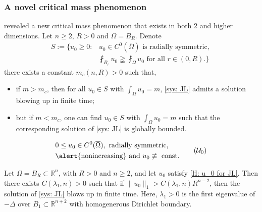 \begin{frame}
\frametitle{A novel critical mass phenomenon}
 revealed a new critical mass phenomenon that exists in both 2 and higher dimensions. Let $n\geqslant 2$, $R>0$ and $\Omega=B_R$. Denote
\begin{align*}
	S:=\biggl\{u_0\geqslant0 : &u_0\in C^0(\overline{\Omega}) \text{ is radially symmetric, } \\ &\fint_{B_r}u_0\gneqq \fint_{\Omega}u_0 \text{ for all } r\in(0, R).\biggr\}
\end{align*}
there exists a constant $m_c(n, R) > 0$ such that, 
\begin{itemize}
    \item if $m>m_c$, then for \alert{all}
$u_0\in S$
with $\int_\Omega u_0 = m$, 
 \eqref{sys: JL} admits a solution blowing up in finite time; 
    \item but if $m<m_c$, one can find $u_0\in S$ with $\int_\Omega u_0 = m$ such that the corresponding solution of \eqref{sys: JL} is globally bounded.
 \end{itemize}
\end{frame}

\begin{frame}
\begin{equation}\label{H: u_0 for JL}
	\begin{aligned}
	&0\leq u_0\in C^0(\overline{\Omega}),\text{ radially symmetric,}\\
	&\text{\alert{nonincreasing} and  } u_0\not\equiv \text{ const.}
	\end{aligned}\tag{$\mathcal{U}_0$}
\end{equation}

\begin{theorem}
Let $\Omega=B_R\subset\mathbb{R}^n$, with $R>0$ and $n\geq2$, and let $u_0$ satisfy \eqref{H: u_0 for JL}. Then there exists $C(\lambda_1,n) > 0$ such that if $\|u_0\|_1 > C(\lambda_1, n) R^{n-2}$, then the solution of \eqref{sys: JL} blows up in finite time. Here, $\lambda_1 > 0$ is the first eigenvalue of $-\Delta$ over $B_1\subset\mathbb{R}^{n+2}$ with homogenerous Dirichlet boundary. 
\end{theorem}
\end{frame}

